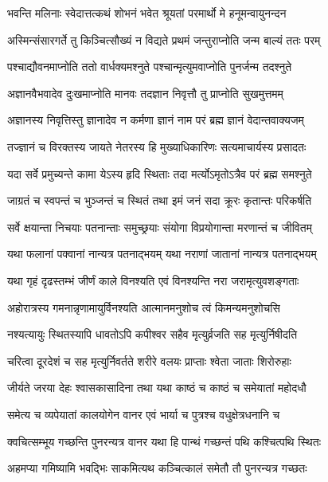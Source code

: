 \twolineshloka
{भवन्ति मलिनाः स्वेदात्तत्कथं शोभनं भवेत}
{श्रूयतां परमार्थो मे हनूमन्वायुनन्दन}%

\twolineshloka
{अस्मिन्संसारगर्ते तु किञ्चित्सौख्यं न विद्यते}
{प्रथमं जन्तुराप्नोति जन्म बाल्यं ततः परम्}%

\twolineshloka
{पश्चाद्यौवनमाप्नोति ततो वार्धक्यमश्नुते}
{पश्चान्मृत्युमवाप्नोति पुनर्जन्म तदश्नुते}%

\twolineshloka
{अज्ञानवैभवादेव दुःखमाप्नोति मानवः}
{तदज्ञान निवृत्तौ तु प्राप्नोति सुखमुत्तमम्}%

\twolineshloka
{अज्ञानस्य निवृत्तिस्तु ज्ञानादेव न कर्मणा}
{ज्ञानं नाम परं ब्रह्म ज्ञानं वेदान्तवाक्यजम्}%

\twolineshloka
{तज्ज्ञानं च विरक्तस्य जायते नेतरस्य हि}
{मुख्याधिकारिणः सत्यमाचार्यस्य प्रसादतः}%

\twolineshloka
{यदा सर्वे प्रमुच्यन्ते कामा येऽस्य हृदि स्थिताः}
{तदा मर्त्योऽमृतोऽत्रैव परं ब्रह्म समश्नुते}%

\twolineshloka
{जाग्रतं च स्वपन्तं च भुञ्जन्तं च स्थितं तथा}
{इमं जनं सदा क्रूरः कृतान्तः परिकर्षति}%

\twolineshloka
{सर्वे क्षयान्ता निचयाः पतनान्ताः समुच्छ्रयाः}
{संयोगा विप्रयोगान्ता मरणान्तं च जीवितम्}%

\twolineshloka
{यथा फलानां पक्वानां नान्यत्र पतनाद्भयम्}
{यथा नराणां जातानां नान्यत्र पतनाद्भयम्}%

\twolineshloka
{यथा गृहं दृढस्तम्भं जीर्णं काले विनश्यति}
{एवं विनश्यन्ति नरा जरामृत्युवशङ्गताः}%

\twolineshloka
{अहोरात्रस्य गमनान्नृणामायुर्विनश्यति}
{आत्मानमनुशोच त्वं किमन्यमनुशोचसि}%

\twolineshloka
{नश्यत्यायुः स्थितस्यापि धावतोऽपि कपीश्वर}
{सहैव मृत्युर्व्रजति सह मृत्युर्निषीदति}%

\twolineshloka
{चरित्वा दूरदेशं च सह मृत्युर्निवर्तते}
{शरीरे वलयः प्राप्ताः श्वेता जाताः शिरोरुहाः}%

\twolineshloka
{जीर्यते जरया देहः श्वासकासादिना तथा}
{यथा काष्ठं च काष्ठं च समेयातां महोदधौ}%

\twolineshloka
{समेत्य च व्यपेयातां कालयोगेन वानर}
{एवं भार्या च पुत्रश्च वधुक्षेत्रधनानि च}%

\twolineshloka
{क्वचित्सम्भूय गच्छन्ति पुनरन्यत्र वानर}
{यथा हि पान्थं गच्छन्तं पथि कश्चित्पथि स्थितः}%

\twolineshloka
{अहमप्या गमिष्यामि भवद्भिः साकमित्यथ}
{कञ्चित्कालं समेतौ तौ पुनरन्यत्र गच्छतः}%

